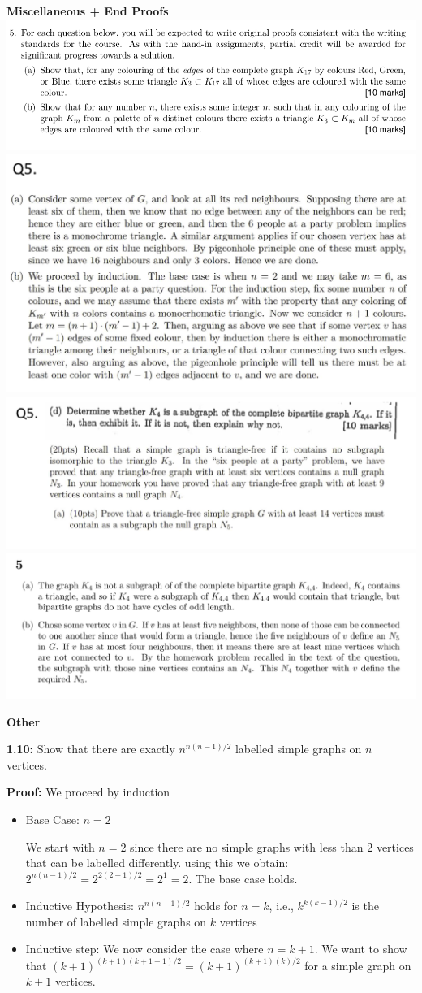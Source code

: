 \documentclass[10pt,landscape]{article}
\begin{document}
\begin{multicols}{2}
\textbf{Miscellaneous + End Proofs}
\includegraphics[width = 9.5 cm]{2022Q5.png}
\includegraphics[width = 9.5 cm]{2022A5.png}
\includegraphics[width = 9.5 cm]{MockQ5.png}
\includegraphics[width = 9.5 cm]{MockA5.png}




\scriptsize

\textbf{Other}

\textbf{1.10:} Show that there are exactly $n^{n(n-1)/2}$ labelled simple graphs on $n$ vertices.

\textbf{Proof:} We proceed by induction
\begin{itemize}
    \item Base Case: $n=2$

    We start with $n=2$ since there are no simple graphs with less than 2 vertices that can be labelled differently. using this we obtain: $2^{n(n-1)/2}=2^{2(2-1)/2} = 2^1 = 2$. The base case holds.
    \item Inductive Hypothesis: $n^{n(n-1)/2}$ holds for $n = k$, i.e.,  $k^{k(k-1)/2}$ is the number of labelled simple graphs on $k$ vertices
    \item Inductive step: We now consider the case where $n = k+1$. We want to show that $(k+1)^{(k+1)(k+1-1)/2} = (k+1)^{(k+1)(k)/2}$ for a simple graph on $k+1$ vertices.


\end{itemize}
\end{multicols}
\end{document}
